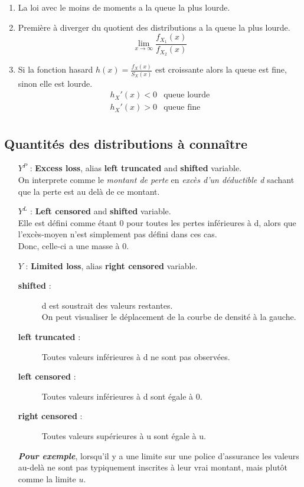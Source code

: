 \documentclass[10pt, french]{article}
\begin{document}
\begin{multicols*}{3}
\begin{enumerate}

\item La loi avec le moins de moments a la queue la plus lourde.
\item Première à diverger du quotient des distributions a la queue la plus lourde.
\[\lim_{x \to \infty} \frac{f_{X_1}(x)}{f_{X_2}(x)}\]
\item Si la fonction hasard $h(x) = \frac{f_X(x)}{S_X(x)}$ est croissante alors la queue est fine, sinon elle est lourde.
\[
\begin{matrix}
	h_X'(x) < 0 & \text{queue lourde} \\
	h_X'(x) > 0 & \text{queue fine} \\
\end{matrix}
\]
\end{enumerate}


\subsection*{Quantités des distributions à connaître}

\begin{itemize}
\item[$Y^P$ : ] 
	\textbf{Excess loss}, alias \textbf{left truncated} and \textbf{shifted} variable. \\
	On interprete comme le \textit{montant de perte} en \textit{excès d'un déductible d} sachant que la perte est au delà de ce montant.


\item[$Y^L$ : ] 
	\textbf{Left censored} and \textbf{shifted} variable. \\ 
	Elle est défini comme étant 0 pour toutes les pertes inférieures à d, alors que l'excès-moyen n'est simplement pas défini dans ces cas. \\
	Donc, celle-ci a une masse à 0.


\item[$Y$ : ] 
	\textbf{Limited loss}, alias \textbf{right censored} variable. \\ 
	


	\begin{description}
		\item[\textbf{shifted} :] d est soustrait des valeurs restantes. \\
		On peut visualiser le déplacement de la courbe de densité à la gauche.
		\item[\textbf{left truncated} :] Toutes valeurs inférieures à d ne sont pas observées.			
		\item[\textbf{left censored} :] Toutes valeurs inférieures à d sont égale à 0.
		\item[\textbf{right censored} :] Toutes valeurs supérieures à u sont égale à u.
	\end{description}	
	\textbf{\textit{Pour exemple}}, lorsqu'il y a une limite sur une police d'assurance les valeurs au-delà ne sont pas typiquement inscrites à leur vrai montant, mais plutôt comme la limite $u$.
\end{itemize}



\end{multicols*}
\end{document}
